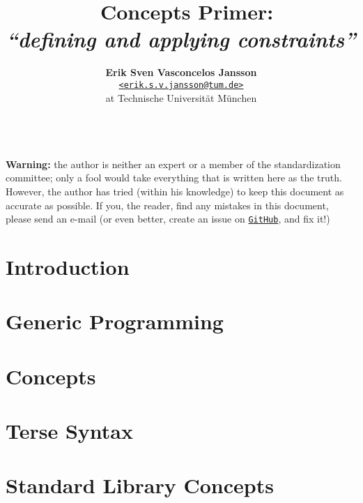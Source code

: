 \documentclass[a4paper, 11pt]{article}
\title{\vspace{-1.5em}\textbf{\Cpp\ Concepts Primer:}\\
       \large{\emph{``defining and applying constraints''}}}
\author{{\textbf{Erik Sven Vasconcelos Jansson}} \\
        {\href{mailto:erik.s.v.jansson@tum.de}
        {\texttt{<erik.s.v.jansson@tum.de>}}} \\
        {at Technische Universität München}}
\begin{document}
    \maketitle \begin{spacing}{0.94} \tableofcontents \end{spacing}

    \mbox{} \\ \noindent \textbf{Warning:} the author is neither an expert or a member of the standardization committee; only a fool would take everything that is written here as the truth. However, the author has tried (within his knowledge) to keep this document as accurate as possible. If you, the reader, find any mistakes in this document, please send an e-mail (or even better, create an issue on \href{https://github.com/CaffeineViking/concepts-primer}{\texttt{GitHub}}, and fix it!) \mbox{}  \thispagestyle{empty} \newpage {}

    \section{Introduction} \label{sec:introduction} 

    \newpage

    \section{Generic Programming} \label{sec:generic_programming} 

    \newpage

    \section{Concepts} \label{sec:concepts} 

    \newpage

    \section{Terse Syntax} \label{sec:terse_syntax} 

    \newpage

    \section{Standard Library Concepts} \label{sec:standard_library_concepts} 
\end{document}
